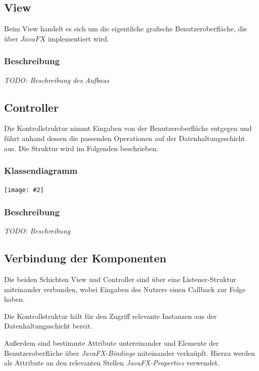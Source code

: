 \documentclass[11pt]{article}
\newcommand{\includediagram}[2]{
	\begin{center}
		\texttt{[image: \#2]}
	\end{center}
}
\begin{document}
\subsection{View}

Beim View handelt es sich um die eigentliche grafische Benutzeroberfläche, die über $\textit{JavaFX}$ implementiert wird.

\subsubsection{Beschreibung}

\textit{TODO: Beschreibung des Aufbaus}

\subsection{Controller}

Die Kontrollstruktur nimmt Eingaben von der Benutzeroberfläche entgegen und führt anhand dessen die passenden Operationen auf der Datenhaltungsschicht aus. Die Struktur wird im Folgenden beschrieben.

\subsubsection{Klassendiagramm}

\includediagram{1.0}{controller.png}

\subsubsection{Beschreibung}

\textit{TODO: Beschreibung}

\subsection{Verbindung der Komponenten}

Die beiden Schichten View und Controller sind über eine Listener-Struktur miteinander verbunden, wobei Eingaben des Nutzers einen Callback zur Folge haben.

Die Kontrollstruktur hält für den Zugriff relevante Instanzen aus der Datenhaltungsschicht bereit.

Außerdem sind bestimmte Attribute untereinander und Elemente der Benutzeroberfläche über \textit{JavaFX-Bindings} miteinander verknüpft. Hierzu werden als Attribute an den relevanten Stellen \textit{JavaFX-Properties} verwendet.
\end{document}
